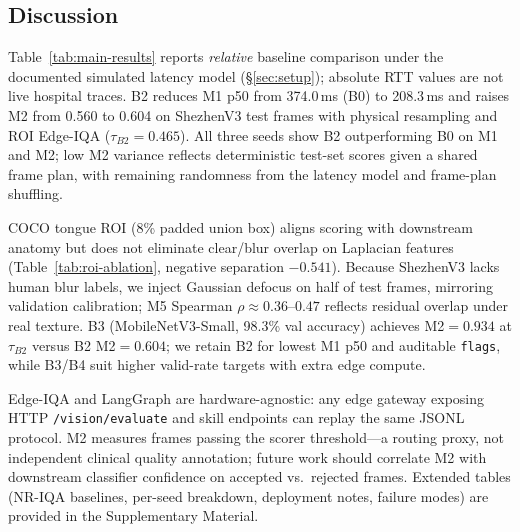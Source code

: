\subsection{Discussion}
\label{sec:discussion}

Table~\ref{tab:main-results} reports \emph{relative} baseline comparison under the documented simulated latency model (\S\ref{sec:setup}); absolute RTT values are not live hospital traces.
B2 reduces M1 p50 from 374.0\,ms (B0) to 208.3\,ms and raises M2 from 0.560 to 0.604 on ShezhenV3 test frames with physical resampling and ROI Edge-IQA ($\tau_{B2}{=}0.465$).
All three seeds show B2 outperforming B0 on M1 and M2; low M2 variance reflects deterministic test-set scores given a shared frame plan, with remaining randomness from the latency model and frame-plan shuffling.

COCO tongue ROI (8\% padded union box) aligns scoring with downstream anatomy but does not eliminate clear/blur overlap on Laplacian features (Table~\ref{tab:roi-ablation}, negative separation $-0.541$).
Because ShezhenV3 lacks human blur labels, we inject Gaussian defocus on half of test frames, mirroring validation calibration; M5 Spearman $\rho{\approx}0.36$--$0.47$ reflects residual overlap under real texture.
B3 (MobileNetV3-Small, 98.3\% val accuracy) achieves M2$=0.934$ at $\tau_{B2}$ versus B2 M2$=0.604$; we retain B2 for lowest M1 p50 and auditable \texttt{flags}, while B3/B4 suit higher valid-rate targets with extra edge compute.

Edge-IQA and LangGraph are hardware-agnostic: any edge gateway exposing HTTP \texttt{/vision/evaluate} and skill endpoints can replay the same JSONL protocol.
M2 measures frames passing the scorer threshold---a routing proxy, not independent clinical quality annotation; future work should correlate M2 with downstream classifier confidence on accepted vs.\ rejected frames.
Extended tables (NR-IQA baselines, per-seed breakdown, deployment notes, failure modes) are provided in the Supplementary Material.
